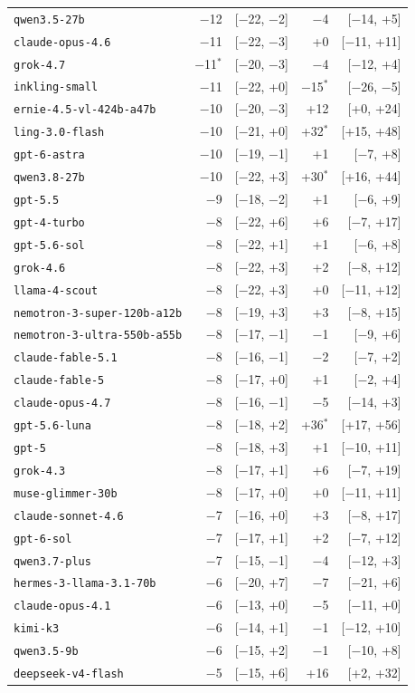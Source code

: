 {\begin{tabular}[t]{lrrrr}
\texttt{qwen3.5-27b} & $-$12 & [$-$22, $-$2] & $-$4 & [$-$14, +5] \\
\texttt{claude-opus-4.6} & $-$11 & [$-$22, $-$3] & +0 & [$-$11, +11] \\
\texttt{grok-4.7} & $-$11$^*$ & [$-$20, $-$3] & $-$4 & [$-$12, +4] \\
\texttt{inkling-small} & $-$11 & [$-$22, +0] & $-$15$^*$ & [$-$26, $-$5] \\
\texttt{ernie-4.5-vl-424b-a47b} & $-$10 & [$-$20, $-$3] & +12 & [+0, +24] \\
\texttt{ling-3.0-flash} & $-$10 & [$-$21, +0] & +32$^*$ & [+15, +48] \\
\texttt{gpt-6-astra} & $-$10 & [$-$19, $-$1] & +1 & [$-$7, +8] \\
\texttt{qwen3.8-27b} & $-$10 & [$-$22, +3] & +30$^*$ & [+16, +44] \\
\texttt{gpt-5.5} & $-$9 & [$-$18, $-$2] & +1 & [$-$6, +9] \\
\texttt{gpt-4-turbo} & $-$8 & [$-$22, +6] & +6 & [$-$7, +17] \\
\texttt{gpt-5.6-sol} & $-$8 & [$-$22, +1] & +1 & [$-$6, +8] \\
\texttt{grok-4.6} & $-$8 & [$-$22, +3] & +2 & [$-$8, +12] \\
\texttt{llama-4-scout} & $-$8 & [$-$22, +3] & +0 & [$-$11, +12] \\
\texttt{nemotron-3-super-120b-a12b} & $-$8 & [$-$19, +3] & +3 & [$-$8, +15] \\
\texttt{nemotron-3-ultra-550b-a55b} & $-$8 & [$-$17, $-$1] & $-$1 & [$-$9, +6] \\
\texttt{claude-fable-5.1} & $-$8 & [$-$16, $-$1] & $-$2 & [$-$7, +2] \\
\texttt{claude-fable-5} & $-$8 & [$-$17, +0] & +1 & [$-$2, +4] \\
\texttt{claude-opus-4.7} & $-$8 & [$-$16, $-$1] & $-$5 & [$-$14, +3] \\
\texttt{gpt-5.6-luna} & $-$8 & [$-$18, +2] & +36$^*$ & [+17, +56] \\
\texttt{gpt-5} & $-$8 & [$-$18, +3] & +1 & [$-$10, +11] \\
\texttt{grok-4.3} & $-$8 & [$-$17, +1] & +6 & [$-$7, +19] \\
\texttt{muse-glimmer-30b} & $-$8 & [$-$17, +0] & +0 & [$-$11, +11] \\
\texttt{claude-sonnet-4.6} & $-$7 & [$-$16, +0] & +3 & [$-$8, +17] \\
\texttt{gpt-6-sol} & $-$7 & [$-$17, +1] & +2 & [$-$7, +12] \\
\texttt{qwen3.7-plus} & $-$7 & [$-$15, $-$1] & $-$4 & [$-$12, +3] \\
\texttt{hermes-3-llama-3.1-70b} & $-$6 & [$-$20, +7] & $-$7 & [$-$21, +6] \\
\texttt{claude-opus-4.1} & $-$6 & [$-$13, +0] & $-$5 & [$-$11, +0] \\
\texttt{kimi-k3} & $-$6 & [$-$14, +1] & $-$1 & [$-$12, +10] \\
\texttt{qwen3.5-9b} & $-$6 & [$-$15, +2] & $-$1 & [$-$10, +8] \\
\texttt{deepseek-v4-flash} & $-$5 & [$-$15, +6] & +16 & [+2, +32] \\
\bottomrule
\end{tabular}}
